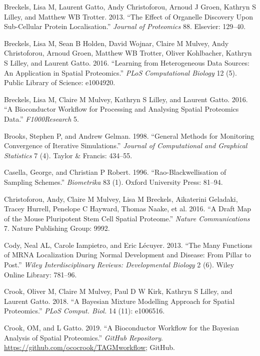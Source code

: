 \documentclass[]{article}
\begin{document}
\hypertarget{ref-Breckels:2013}{}
Breckels, Lisa M, Laurent Gatto, Andy Christoforou, Arnoud J Groen,
Kathryn S Lilley, and Matthew WB Trotter. 2013. ``The Effect of
Organelle Discovery Upon Sub-Cellular Protein Localisation.''
\emph{Journal of Proteomics} 88. Elsevier: 129--40.

\hypertarget{ref-Breckels:2016}{}
Breckels, Lisa M, Sean B Holden, David Wojnar, Claire M Mulvey, Andy
Christoforou, Arnoud Groen, Matthew WB Trotter, Oliver Kohlbacher,
Kathryn S Lilley, and Laurent Gatto. 2016. ``Learning from Heterogeneous
Data Sources: An Application in Spatial Proteomics.'' \emph{PLoS
Computational Biology} 12 (5). Public Library of Science: e1004920.

\hypertarget{ref-Breckels:2016b}{}
Breckels, Lisa M, Claire M Mulvey, Kathryn S Lilley, and Laurent Gatto.
2016. ``A Bioconductor Workflow for Processing and Analysing Spatial
Proteomics Data.'' \emph{F1000Research} 5.

\hypertarget{ref-Brooks:1998}{}
Brooks, Stephen P, and Andrew Gelman. 1998. ``General Methods for
Monitoring Convergence of Iterative Simulations.'' \emph{Journal of
Computational and Graphical Statistics} 7 (4). Taylor \& Francis:
434--55.

\hypertarget{ref-Casella:1996}{}
Casella, George, and Christian P Robert. 1996. ``Rao-Blackwellisation of
Sampling Schemes.'' \emph{Biometrika} 83 (1). Oxford University Press:
81--94.

\hypertarget{ref-hyper}{}
Christoforou, Andy, Claire M Mulvey, Lisa M Breckels, Aikaterini
Geladaki, Tracey Hurrell, Penelope C Hayward, Thomas Naake, et al. 2016.
``A Draft Map of the Mouse Pluripotent Stem Cell Spatial Proteome.''
\emph{Nature Communications} 7. Nature Publishing Group: 9992.

\hypertarget{ref-Cody:2013}{}
Cody, Neal AL, Carole Iampietro, and Eric Lécuyer. 2013. ``The Many
Functions of MRNA Localization During Normal Development and Disease:
From Pillar to Post.'' \emph{Wiley Interdisciplinary Reviews:
Developmental Biology} 2 (6). Wiley Online Library: 781--96.

\hypertarget{ref-Crook:2018}{}
Crook, Oliver M, Claire M Mulvey, Paul D W Kirk, Kathryn S Lilley, and
Laurent Gatto. 2018. ``A Bayesian Mixture Modelling Approach for Spatial
Proteomics.'' \emph{PLoS Comput. Biol.} 14 (11): e1006516.

\hypertarget{ref-ghrepo}{}
Crook, OM, and L Gatto. 2019. ``A Bioconductor Workflow for the Bayesian
Analysis of Spatial Proteomics.'' \emph{GitHub Repository}.
\url{https://github.com/ococrook/TAGMworkflow}; GitHub.
\end{document}
